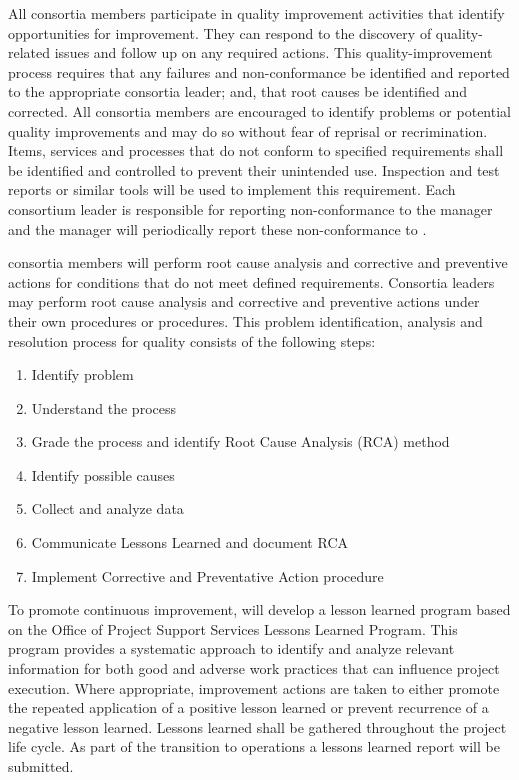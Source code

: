 All  consortia members participate in quality improvement
activities that identify opportunities for improvement. They can
respond to the discovery of quality-related issues and follow up on
any required actions. This quality-improvement process requires that
any failures and non-conformance be identified and reported to the
appropriate consortia leader; and, that root causes be identified and
corrected. All consortia members are encouraged to identify problems
or potential quality improvements and may do so without fear of
reprisal or recrimination. Items, services and processes that do not
conform to specified requirements shall be identified and controlled
to prevent their unintended use. Inspection and test reports or
similar tools will be used to implement this requirement. Each
consortium leader is responsible for reporting non-conformance to the
  manager and the 
 manager will periodically report these non-conformance to
 .

 consortia members will perform root cause analysis and
corrective and preventive actions for conditions that do not meet
defined requirements. Consortia leaders may perform root cause
analysis and corrective and preventive actions under their own
procedures or \fnal procedures.  This problem identification, analysis
and resolution process for quality consists of the following steps:
\begin{enumerate}
  \item Identify problem
  \item Understand the process
  \item Grade the process and identify Root Cause Analysis (RCA)
    method
  \item Identify possible causes
  \item Collect and analyze data
  \item Communicate Lessons Learned and document RCA
  \item Implement Corrective and Preventative Action procedure
\end{enumerate}


To promote continuous improvement,   will develop a
lesson learned program based on the \fnal Office of Project Support
Services Lessons Learned Program. This program provides a systematic
approach to identify and analyze relevant information for both good
and adverse work practices that can influence project execution. Where
appropriate, improvement actions are taken to either promote the
repeated application of a positive lesson learned or prevent
recurrence of a negative lesson learned. Lessons learned shall be
gathered throughout the project life cycle. As part of the transition
to operations a lessons learned report will be submitted.

